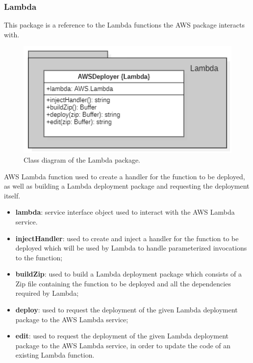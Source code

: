 	\subsubsection{Lambda}
	This package is a reference to the Lambda functions the AWS package interacts with.
	\begin{figure} [h!]
		\centering
		\includegraphics[width=0.7\linewidth]{diagrammi/etherless-server/Lambda}
		\caption{Class diagram of the Lambda package.}
	\end{figure}
	AWS Lambda function used to create a handler for the function to be deployed, as well as building a Lambda deployment package and requesting the deployment itself.
	\begin{itemize}
		\item \textbf{lambda}: service interface object used to interact with the AWS Lambda service.
	\end{itemize}
	\begin{itemize}
		\item \textbf{injectHandler}: used to create and inject a handler for the function to be deployed which will be used by Lambda to handle parameterized invocations to the function;
		\item \textbf{buildZip}: used to build a Lambda deployment package which consists of a Zip file containing the function to be deployed and all the dependencies required by Lambda;
		\item \textbf{deploy}: used to request the deployment of the given Lambda deployment package to the AWS Lambda service;
		\item \textbf{edit}: used to request the deployment of the given Lambda deployment package to the AWS Lambda service, in order to update the code of an existing Lambda function.
	\end{itemize}
